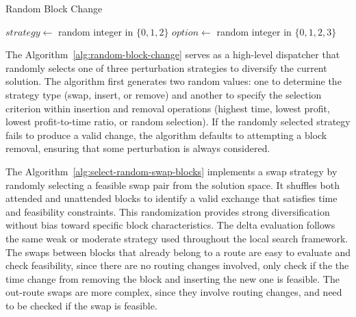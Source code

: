 \begin{algorithm}[h!]
	\caption{Random Block Change} \label{alg:random-block-change}
	\SetAlgoLined

	$strategy \leftarrow$ random integer in $\{0, 1, 2\}$\;
	$option \leftarrow$ random integer in $\{0, 1, 2, 3\}$\;
	\If{$\Delta \neq \emptyset$}{
		\Return{$\Delta$}\;
	}
	\;
\end{algorithm}

The Algorithm~\ref{alg:random-block-change} serves as a high-level dispatcher that randomly selects one of three perturbation strategies to diversify the current solution. The algorithm first generates two random values: one to determine the strategy type (swap, insert, or remove) and another to specify the selection criterion within insertion and removal operations (highest time, lowest profit, lowest profit-to-time ratio, or random selection). If the randomly selected strategy fails to produce a valid change, the algorithm defaults to attempting a block removal, ensuring that some perturbation is always considered.

The Algorithm~\ref{alg:select-random-swap-blocks} implements a swap strategy by randomly selecting a feasible swap pair from the solution space. It shuffles both attended and unattended blocks to identify a valid exchange that satisfies time and feasibility constraints. This randomization provides strong diversification without bias toward specific block characteristics. The delta evaluation follows the same weak or moderate strategy used throughout the local search framework. The swaps between blocks that already belong to a route are easy to evaluate and check feasibility, since there are no routing changes involved, only check if the the time change from removing the block and inserting the new one is feasible. The out-route swaps are more complex, since they involve routing changes, and need to be checked if the swap is feasible.

